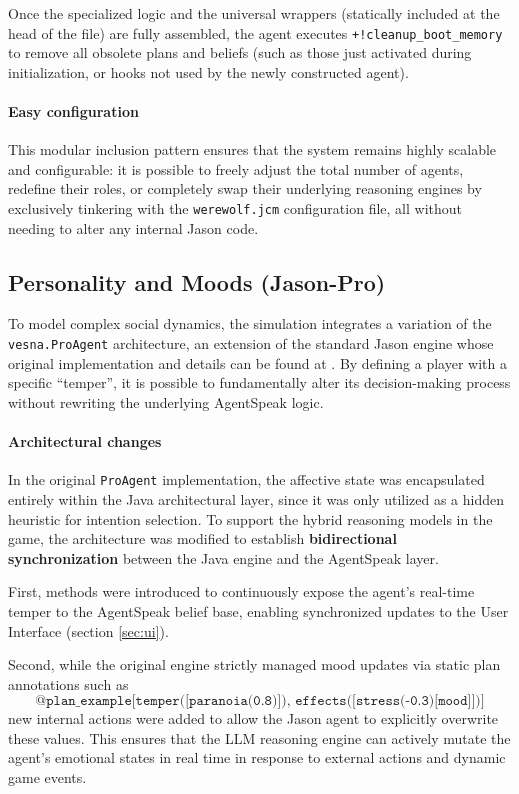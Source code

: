 Once the specialized logic and the universal wrappers (statically included at the head of the file) are fully assembled, the agent executes \texttt{+!cleanup\_boot\_memory} to remove all obsolete plans and beliefs (such as those just activated during initialization, or hooks not used by the newly constructed agent).

\paragraph{Easy configuration}
This modular inclusion pattern ensures that the system remains highly scalable and configurable: it is possible to freely adjust the total number of agents, redefine their roles, or completely swap their underlying reasoning engines by exclusively tinkering with the \texttt{werewolf.jcm} configuration file, all without needing to alter any internal Jason code.



\subsection{Personality and Moods (Jason-Pro)}

To model complex social dynamics, the simulation integrates a variation of the \texttt{vesna.ProAgent} architecture, an extension of the standard Jason engine whose original implementation and details can be found at \cite{vesna_pro_toolkit}. By defining a player with a specific ``temper'', it is possible to fundamentally alter its decision-making process without rewriting the underlying AgentSpeak logic. 

\paragraph{Architectural changes} 
In the original \texttt{ProAgent} implementation, the affective state was encapsulated entirely within the Java architectural layer, since it was only utilized as a hidden heuristic for intention selection. To support the  hybrid reasoning models in the game, the architecture was modified to establish \textbf{bidirectional synchronization} between the Java engine and the AgentSpeak layer.

First, methods were introduced to continuously expose the agent's real-time temper to the AgentSpeak belief base, enabling synchronized updates to the User Interface (section \ref{sec:ui}).

Second, while the original engine strictly managed mood updates via static plan annotations such as $$\texttt{@plan\_example[temper([paranoia(0.8)]), effects([stress(-0.3)[mood]])]} $$ new internal actions were added to allow the Jason agent to explicitly overwrite these values. This ensures that the LLM reasoning engine can actively mutate the agent's emotional states in real time in response to external actions and dynamic game events.

